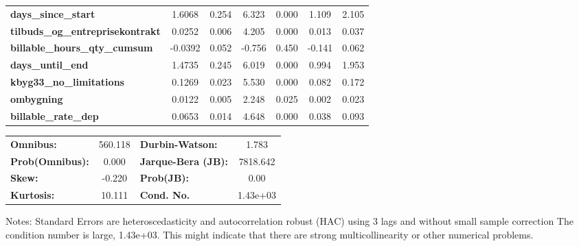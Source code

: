 \begin{center}
\begin{tabular}{lcccccc}
\textbf{days\_since\_start}              &       1.6068  &        0.254     &     6.323  &         0.000        &        1.109    &        2.105     \\
\textbf{tilbuds\_og\_entreprisekontrakt} &       0.0252  &        0.006     &     4.205  &         0.000        &        0.013    &        0.037     \\
\textbf{billable\_hours\_qty\_cumsum}    &      -0.0392  &        0.052     &    -0.756  &         0.450        &       -0.141    &        0.062     \\
\textbf{days\_until\_end}                &       1.4735  &        0.245     &     6.019  &         0.000        &        0.994    &        1.953     \\
\textbf{kbyg33\_no\_limitations}         &       0.1269  &        0.023     &     5.530  &         0.000        &        0.082    &        0.172     \\
\textbf{ombygning}                       &       0.0122  &        0.005     &     2.248  &         0.025        &        0.002    &        0.023     \\
\textbf{billable\_rate\_dep}             &       0.0653  &        0.014     &     4.648  &         0.000        &        0.038    &        0.093     \\
\bottomrule
\end{tabular}
\begin{tabular}{lclc}
\textbf{Omnibus:}       & 560.118 & \textbf{  Durbin-Watson:     } &    1.783  \\
\textbf{Prob(Omnibus):} &   0.000 & \textbf{  Jarque-Bera (JB):  } & 7818.642  \\
\textbf{Skew:}          &  -0.220 & \textbf{  Prob(JB):          } &     0.00  \\
\textbf{Kurtosis:}      &  10.111 & \textbf{  Cond. No.          } & 1.43e+03  \\
\bottomrule
\end{tabular}
\end{center}

Notes: \newline
 [1] Standard Errors are heteroscedasticity and autocorrelation robust (HAC) using 3 lags and without small sample correction \newline
 [2] The condition number is large, 1.43e+03. This might indicate that there are \newline
 strong multicollinearity or other numerical problems.